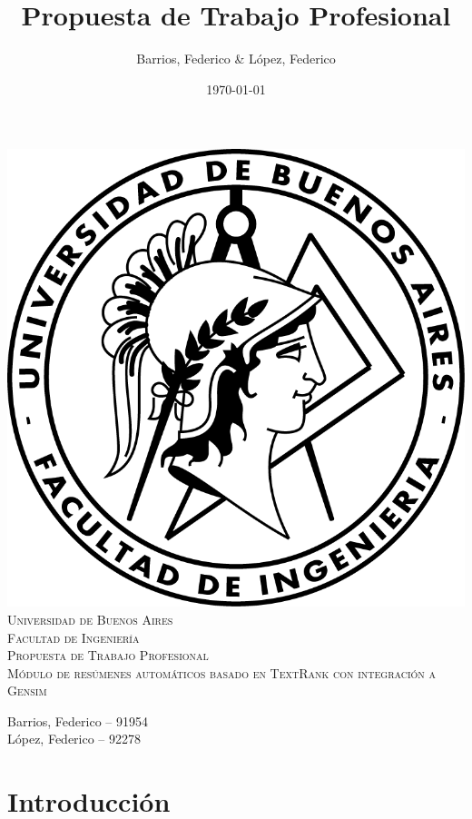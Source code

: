 \documentclass[12pt,a4paper]{article}
\title{Propuesta de Trabajo Profesional}
\author{Barrios, Federico & López, Federico}
\date{\today}
\begin{document}
\thispagestyle{empty}

\begin{center}
\includegraphics{./logo-fiuba.png}\\
\vspace{1cm}
\textsc{\LARGE Universidad de Buenos Aires}\\[0.3cm]
\textsc{\LARGE Facultad de Ingeniería}\\[1.2cm]
\textsc{\Large Propuesta de Trabajo Profesional}\\[0.3cm]
\vspace{1.5cm}
\textsc{\Large Módulo de resúmenes automáticos basado en TextRank con integración a Gensim}\\[0.3cm]
\end{center}

\begin{flushright}
{\large
\vspace{2.5cm}
Barrios, Federico -- 91954\\
L\'opez, Federico -- 92278\\[0.1cm]
}

\end{flushright}

\newpage
\tableofcontents

\setcounter{page}{1}
\newpage
\section{Introducción}
\end{document}
